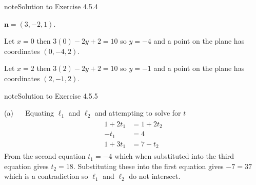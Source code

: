 \documentclass[letterpaper,10pt,english]{jupyterBook}
\begin{document}
\begin{sphinxadmonition}{note}{Solution to Exercise 4.5.4}



\sphinxAtStartPar
\(\mathbf{n} = (3, -2, 1)\).

\sphinxAtStartPar
Let \(x=0\) then \(3(0) - 2 y + 2 = 10\) so \(y = -4\) and a point on the plane has co\sphinxhyphen{}ordinates \((0, -4, 2)\).

\sphinxAtStartPar
Let \(x = 2\) then \(3(2) - 2 y + 2 = 10\) so \(y = -1\) and a point on the plane has co\sphinxhyphen{}ordinates \((2, -1, 2)\).
\end{sphinxadmonition}
 \label{_pages/A4_Coordinate_geometry_exercises_solutions:_pages/A4_Coordinate_geometry_exercises_solutions-solution-4}

\begin{sphinxadmonition}{note}{Solution to Exercise 4.5.5}



\sphinxAtStartPar
(a)   Equating \(\ell_1\) and \(\ell_2\) and attempting to solve for \(t\)
\begin{equation*}
\begin{split} \begin{align*}
    1 + 2t_1 &= 1 + 2t_2 \\
    -t_1 &= 4 \\
    1 + 3t_1 &= 7 - t_2
\end{align*} \end{split}
\end{equation*}
\sphinxAtStartPar
From the second equation \(t_1 = -4\) which when substituted into the third equation gives \(t_2 = 18\). Substituting these into the first equation gives \(-7 = 37\) which is a contradiction so \(\ell_1\) and \(\ell_2\) do not intersect.


\end{sphinxadmonition}
\end{document}
